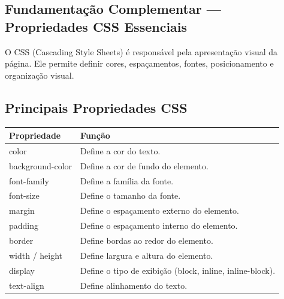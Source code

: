 \documentclass[12pt,a4paper]{article}
\begin{document}
\newpage

\subsection{Fundamentação Complementar — Propriedades CSS Essenciais}

O CSS (Cascading Style Sheets) é responsável pela apresentação visual da página.  
Ele permite definir cores, espaçamentos, fontes, posicionamento e organização visual.

\subsection{Principais Propriedades CSS}

\begin{boxTabela}
\begin{tabular}{|p{4cm}|p{12cm}|}
\hline
\rowcolor{pretoTabela}
\color{white}\textbf{Propriedade} &
\color{white}\textbf{Função} \\
\hline

color & Define a cor do texto. \\
\hline

background-color & Define a cor de fundo do elemento. \\
\hline

font-family & Define a família da fonte. \\
\hline

font-size & Define o tamanho da fonte. \\
\hline

margin & Define o espaçamento externo do elemento. \\
\hline

padding & Define o espaçamento interno do elemento. \\
\hline

border & Define bordas ao redor do elemento. \\
\hline

width / height & Define largura e altura do elemento. \\
\hline

display & Define o tipo de exibição (block, inline, inline-block). \\
\hline

text-align & Define alinhamento do texto. \\
\hline

\end{tabular}
\end{boxTabela}
\end{document}
